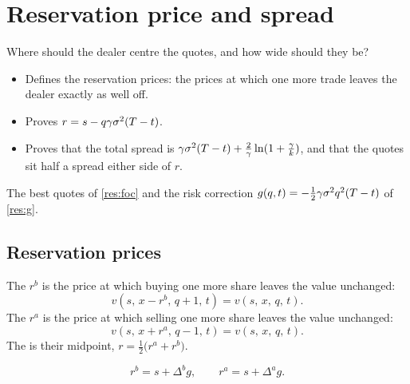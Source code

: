 \chapter{Reservation price and spread}
\label{ch:answers}

\begin{question}
Where should the dealer centre the quotes, and how wide should they be?
\end{question}

\begin{whatfor}
\begin{itemize}
  \item Defines the reservation prices: the prices at which one more trade leaves the dealer exactly as well off.
  \item Proves $r=s-q\gamma\sigma^2(T-t)$.
  \item Proves that the total spread is $\gamma\sigma^2(T-t)+\frac2\gamma\ln(1+\frac\gamma k)$, and that the quotes sit half a spread either side of $r$.
\end{itemize}
\end{whatfor}

\begin{setup}[Setup]
The best quotes of \cref{res:foc} and the risk correction $g(q,t)=-\tfrac12\gamma\sigma^2q^2(T-t)$ of \cref{res:g}.
\end{setup}

\section{Reservation prices}

\begin{definition}
\label{def:reservation}
The  $r^b$ is the price at which buying one more share leaves the value unchanged:
\[
  v(s,\,x-r^b,\,q+1,\,t)=v(s,\,x,\,q,\,t).
\]
The  $r^a$ is the price at which selling one more share leaves the value unchanged:
\[
  v(s,\,x+r^a,\,q-1,\,t)=v(s,\,x,\,q,\,t).
\]
The  is their midpoint, $r=\tfrac12\big(r^a+r^b\big)$.
\end{definition}

\begin{result}
\label{res:rbra}
\[
  r^b=s+\Delta^bg,\qquad r^a=s+\Delta^ag.
\]
\end{result}


